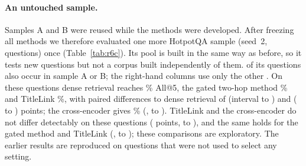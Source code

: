 \documentclass[a4paper,fleqn]{cas-sc}
\begin{document}
\paragraph{An untouched sample.} Samples A and B were reused while the methods were developed. After freezing all methods we therefore evaluated one more HotpotQA sample (seed~2, \RcN{} questions) once (Table~\ref{tab:r6c}). Its pool is built in the same way as before, so it tests new questions but not a corpus built independently of them. \RcOverlap{} of its questions also occur in sample A or B; the right-hand columns use only the other \RcDisj{}. On these questions dense retrieval reaches \RcDenseDisAll\% All@5, the gated two-hop method \RcGateDisAll\% and TitleLink \RcTlDisAll\%, with paired differences to dense retrieval of \RcGateDisD{} (interval \RcGateDisLo{} to \RcGateDisHi{}) and \RcTlDisD{} (\RcTlDisLo{} to \RcTlDisHi{}) points; the cross-encoder gives \RcCeDisAll\% (\RcCeDisD{}, \RcCeDisLo{} to \RcCeDisHi{}). TitleLink and the cross-encoder do not differ detectably on these questions (\RpTlCeD{} points, \RpTlCeLo{} to \RpTlCeHi{}), and the same holds for the gated method and TitleLink (\RpGateTlD{}, \RpGateTlLo{} to \RpGateTlHi{}); these comparisons are exploratory. The earlier results are reproduced on questions that were not used to select any setting.

\end{document}
